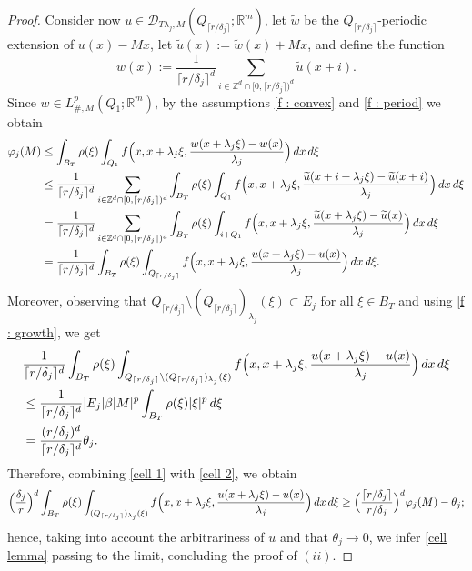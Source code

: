 \documentclass{article}
\theoremstyle{definition}
\newcommand{\f}{\varphi}
\newcommand{\dej}{\delta_j}
\newcommand{\R}{\mathbb{R}}
\begin{document}
\begin{proof}
Consider now $u\in \mathcal{D}_{T\lambda_j,M}(Q_{\lceil r/\dej\rceil};\R^m)$, let $\widetilde{w}$ be the $Q_{\lceil r/\dej\rceil}$-periodic extension of $u(x)-Mx$, let $\widetilde{u}(x):=\widetilde{w}(x)+Mx$, and define the function 
\begin{equation*}
    w(x):=\frac{1}{\lceil r/\dej \rceil^d} \sum_{i\in \mathbb{Z}^d\cap [0,\lceil r/\dej \rceil)^d} \widetilde{u}(x+i).
\end{equation*}
Since $w\in L^p_{\#,M}(Q_1; \R^m)$, by the assumptions \eqref{f : convex} and \eqref{f : period} we obtain
\begin{align} \nonumber
    \f_j(M) & \leq \int_{B_T} \rho(\xi)\int_{Q_1} f\Bigl(x,x+\lambda_j\xi,\frac{w(x+\lambda_j\xi)-w(x)}{\lambda_j}\Bigr)\, dx\,d\xi \\ \nonumber
    & \leq \frac{1}{\lceil r/\dej \rceil^d} \sum_{i\in \mathbb{Z}^d\cap [0,\lceil r/\dej \rceil)^d}  \int_{B_T} \rho(\xi)\int_{Q_1} f\Bigl(x, x+\lambda_j\xi, \frac{\widetilde{u}(x+i+\lambda_j\xi)-\widetilde{u}(x+i)}{\lambda_j}\Bigr)\, dx\,d\xi \\ \nonumber
    & = \frac{1}{\lceil r/\dej \rceil^d} \sum_{i\in \mathbb{Z}^d\cap [0,\lceil r/\dej \rceil)^d}  \int_{B_T} \rho(\xi)\int_{i+Q_1} f\Bigl(x, x+\lambda_j\xi, \frac{\widetilde{u}(x+\lambda_j\xi)-\widetilde{u}(x)}{\lambda_j}\Bigr)\, dx\,d\xi \\ \label{cell 1}
    & = \frac{1}{\lceil r/\dej \rceil^d} \int_{B_T} \rho(\xi)\int_{Q_{\lceil r/\dej\rceil}} f\Bigl(x,x+\lambda_j\xi,\frac{u(x+\lambda_j\xi)-u(x)}{\lambda_j}\Bigr)\, dx\,d\xi.
\end{align}
Moreover, observing that $Q_{\lceil r/\dej\rceil}\setminus (Q_{\lceil r/\dej\rceil})_{\lambda_j}(\xi)\subset E_j$ for all $\xi\in B_T$ and using \eqref{f : growth}, we get 
\begin{align} \nonumber
    & \frac{1}{\lceil r/\dej \rceil^d} \int_{B_T} \rho(\xi)\int_{Q_{\lceil r/\dej\rceil}\setminus (Q_{\lceil r/\dej\rceil})_{\lambda_j}(\xi)} f\Bigl(x, x+\lambda_j\xi,\frac{u(x+\lambda_j\xi)-u(x)}{\lambda_j}\Bigr)\, dx\,d\xi \\ \nonumber
    & \leq \frac{1}{\lceil r/\dej \rceil^d} |E_j| \beta |M|^p\int_{B_T} \rho(\xi)|\xi|^p\, d\xi \\ \label{cell 2}
    & = \frac{(r/\dej)^d}{\lceil r/\dej \rceil^d}  \theta_j.
 \end{align}
Therefore, combining \eqref{cell 1} with \eqref{cell 2}, we obtain
\begin{align*}
  \Bigl(\frac{\dej}{r}\Bigr)^d\int_{B_T} \rho(\xi)\int_{(Q_{\lceil r/\dej\rceil})_{\lambda_j}(\xi)} f\Bigl(x,x+\lambda_j\xi,\frac{u(x+\lambda_j\xi)-u(x)}{\lambda_j}\Bigr)\, dx\,d\xi \geq \Bigl(\frac{\lceil r/\dej \rceil}{r/\dej}\Bigr)^d\f_j(M)-\theta_j;
\end{align*}
hence, taking into account the arbitrariness of $u$ and that $\theta_j\to0$, we infer \eqref{cell lemma} passing to the limit, concluding the proof of $(ii)$.


\end{proof}
\end{document}
